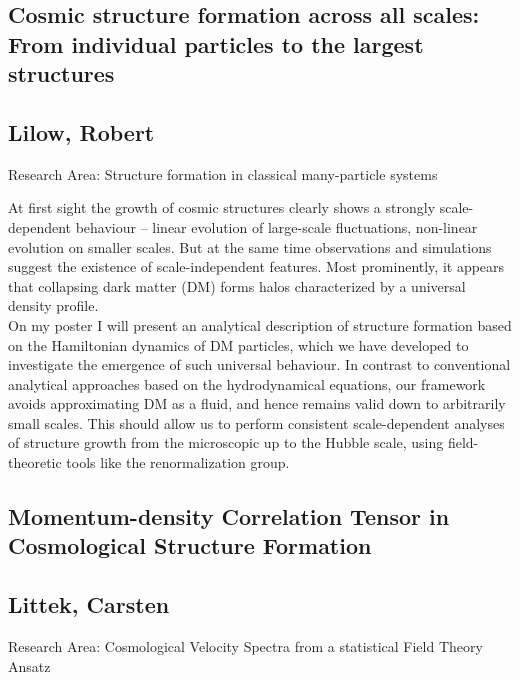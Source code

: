 \subsection*{\centering \large Cosmic structure formation across all scales: From individual particles to the largest structures}
\subsection*{\centering \normalsize Lilow, Robert}
Research Area: Structure formation in classical many-particle systems\newline

\noindent At first sight the growth of cosmic structures clearly shows a strongly scale-dependent behaviour -- linear evolution of large-scale fluctuations, non-linear evolution on smaller scales. But at the same time observations and simulations suggest the existence of scale-independent features. Most prominently, it appears that collapsing dark matter (DM) forms halos characterized by a universal density profile.\\On my poster I will present an analytical description of structure formation based on the Hamiltonian dynamics of DM particles, which we have developed to investigate the emergence of such universal behaviour. In contrast to conventional analytical approaches based on the hydrodynamical equations, our framework avoids approximating DM as a fluid, and hence remains valid down to arbitrarily small scales. This should allow us to perform consistent scale-dependent analyses of structure growth from the microscopic up to the Hubble scale, using field-theoretic tools like the renormalization group.
\newpage
\subsection*{\centering \large Momentum-density Correlation Tensor in Cosmological Structure Formation}
\subsection*{\centering \normalsize Littek, Carsten}
Research Area: Cosmological Velocity Spectra from a statistical Field Theory Ansatz\newline

